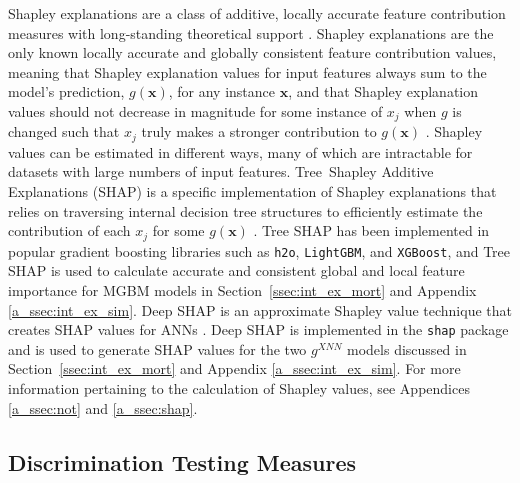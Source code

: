\documentclass[information,article,accept,moreauthors,pdftex]{Definitions/mdpi}
\begin{document}
Shapley explanations are a class of additive, locally accurate feature contribution measures with long-standing theoretical support \cite{shapley,shapley1988shapley}. Shapley explanations are the only known locally accurate and globally consistent feature contribution values, meaning that Shapley explanation values for input features always sum to the model's prediction, $g(\mathbf{x})$, for any instance $\mathbf{x}$, and that Shapley explanation values should not decrease in magnitude for some instance of $x_j$ when $g$ is changed such that $x_j$ truly makes a stronger contribution to $g(\mathbf{x})$ \cite{shapley,tree_shap}. Shapley values can be estimated in different ways, many of which are intractable for datasets with large numbers of input features. Tree~Shapley Additive Explanations (SHAP) is a specific implementation of Shapley explanations that relies on traversing internal decision tree structures to efficiently estimate the contribution of each $x_j$ for some $g(\mathbf{x})$ \cite{tree_shap}. Tree SHAP has been implemented in popular gradient boosting libraries such as 
{\texttt{{h2o}}}, 
{\texttt{{LightGBM}}}, and 
{\texttt{{XGBoost}}}, and Tree SHAP is used to calculate accurate and consistent global and local feature importance for MGBM models in Section~\ref{ssec:int_ex_mort} and Appendix \ref{a_ssec:int_ex_sim}. Deep SHAP is an approximate Shapley value technique that creates SHAP values for ANNs \cite{shapley}. Deep SHAP is implemented in the 
{\texttt{{shap}}} package and is used to generate SHAP values for the two $g^{XNN}$ models discussed in Section~\ref{ssec:int_ex_mort} and Appendix \ref{a_ssec:int_ex_sim}. For more information pertaining to the calculation of Shapley values, see Appendices \ref{a_ssec:not} and \ref{a_ssec:shap}.%

\subsection{Discrimination Testing Measures}\label{ssec:di}
\end{document}
